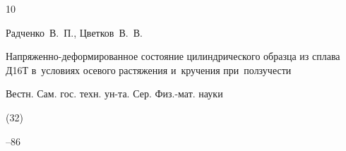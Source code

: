 \begin{thebibliography}{10}




%
























\by Радченко~В.~П., Цветков~В.~В.

\paper Напряженно-деформированное состояние цилиндрического образца из сплава Д16Т в~условиях осевого растяжения и~кручения при~ползучести

\jour Вестн. Сам. гос. техн. ун-та. Сер. Физ.-мат. науки


(32)

--86














\end{thebibliography}





